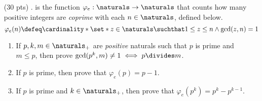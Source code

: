 \begin{enumerate}
  \item[(30 pts) \quad 5.]
     is the function $\varphi_e: \naturals \to \naturals$ that counts how many positive integers are \emph{coprime} with each $n \in \naturals$, defined below.
    \begin{equation*}
      \varphi_e(n)
      \defeq \cardinality*{\set*{z \in \naturals \suchthat 1 \leq z \leq n \land \gcd(z, n) = 1}}
    \end{equation*}
    \begin{enumerate}
      \item
        If $p, k, m \in \naturals_+$ are \emph{positive} naturals such that $p$ is prime and $m \leq p$, then prove $\gcd(p^k, m) \neq 1 \iff p \divides m$.
      \item
        If $p$ is prime, then prove that $\varphi_e(p) = p - 1$.
      \item
        If $p$ is prime and $k \in \naturals_+$, then prove that $\varphi_e(p^k) = p^k - p^{k - 1}$.%
    \end{enumerate}
\end{enumerate}


